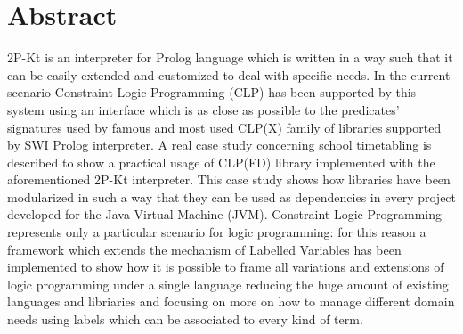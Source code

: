 
\cleardoublepage
{}
{}
\begingroup
\let\clearpage\relax
\let\cleardoublepage\relax
\let\cleardoublepage\relax

\chapter*{Abstract}

%
%
2P-Kt is an interpreter for Prolog language which is written in a way such that it can be easily extended and customized to deal with
specific needs. In the current scenario Constraint Logic Programming (CLP) has been supported by this system using an interface which is
as close as possible to the predicates' signatures used by famous and most used CLP(X) family of libraries supported by SWI Prolog interpreter.
A real case study concerning school timetabling is described to show a practical usage of CLP(FD) library implemented with the aforementioned 2P-Kt interpreter.
This case study shows how libraries have been modularized in such a way that they can be used as dependencies in every project developed for the Java
Virtual Machine (JVM).\newline
Constraint Logic Programming represents only a particular scenario for logic programming: for this reason a framework which extends the
mechanism of Labelled Variables has been implemented to show how it is possible to frame all variations and extensions of logic programming under a
single language reducing the huge amount of existing languages and libriaries and focusing on more on how to manage different domain needs using labels
which can be associated to every kind of term.
\endgroup

\vfill

